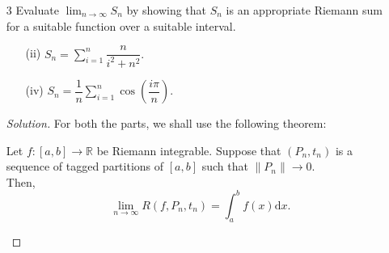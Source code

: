 \documentclass[12pt]{article}
\theoremstyle{definition}
\newenvironment{soln}{\begin{proof}[Solution]}{\end{proof}}
\begin{document}
\begin{itemize}
\begin{itemize}
\begin{soln}
			Now, consider the partition of $[a, b]$ given as
			\begin{equation*} 
				P = \{a, c - \delta/2, c + \delta/2, b\}.
			\end{equation*}
			Now, note that
			\begin{equation*} 
				\inf_{x \in [c - \delta/2, c + \delta/2]} f(x) \ge \dfrac{\epsilon}{2}.
			\end{equation*}

			Thus, $L(P, f) > 0.$ As $L(f)$ is the supremum over all such $L(P, f),$ we see that $L(f) > 0.$ Since $f$ is given to be Riemann integrable, we know that the integral is $L(f)$ and we are done.
		\end{soln}
		\item[(b)] Give an example of a Riemann integrable function on $[a, b]$ such that $f(x)	\ge 0$ for all $x \in [a, b]$ and $\displaystyle\int_{a}^{b} f(x) {\mathrm{d}}x = 0,$ but $f(x) \neq 0$ for some $x \in [a, b].$
		\begin{soln}
			Let $a = 0, b = 2$ and $f:[a, b] \to \mathbb{R}$ be defined as
			\begin{equation*} 
				f(x) \vcentcolon= \begin{cases}
					0 & x \neq 1,\\
					1 & x = 1.
				\end{cases}
			\end{equation*}
			Show that $f$ is actually Riemann integrable on $[0, 2]$ with the integral equal to $0.$
		\end{soln}
	\end{itemize}
	\newpage
	\item[3] Evaluate $\displaystyle\lim_{n\to \infty}S_n$ by showing that $S_n$ is an appropriate Riemann sum for a suitable function over a suitable interval.

	\begin{itemize}
		\item[(ii)] $S_n = \sum_{i = 1}^{n}\dfrac{n}{i^2 + n^2}.$
		\item[(iv)] $S_n = \dfrac{1}{n}\sum_{i = 1}^{n}\cos\left(\dfrac{i\pi}{n}\right).$
	\end{itemize}

	\begin{soln}
		For both the parts, we shall use the following theorem:
		
		\begin{thm}
			Let $f:[a, b] \to \mathbb{R}$ be Riemann integrable. Suppose that $(P_n, t_n)$ is a sequence of tagged partitions of $[a, b]$ such that $\|P_n\| \to 0.$\\
			Then,
			\begin{equation*} 
				\lim_{n\to \infty}R(f, P_n, t_n) = \int_{a}^{b} f(x) {\mathrm{d}}x.
			\end{equation*}
		\end{thm}


\end{soln}
\end{itemize}
\end{document}
